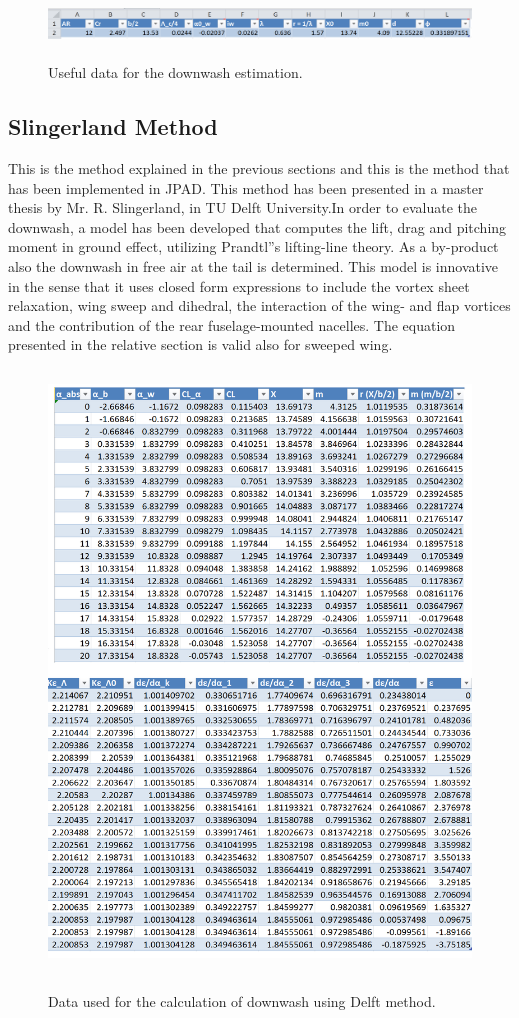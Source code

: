 \begin{figure}[H]
	\centering
{\includegraphics[height=1.1cm]{Immagini/datadownwash.png}} 
	\caption{Useful data for the downwash estimation.}
	\label{usefuldata}
\end{figure}

\subsection {Slingerland Method }

This is the method explained in the previous sections and this is the method that has been implemented in JPAD. This method has been presented in a master thesis by Mr. R. Slingerland, in TU Delft University.In order to evaluate the downwash, a model has been developed that computes the lift, drag and pitching moment in ground effect, utilizing Prandtl''s lifting-line theory. As a by-product also the downwash in free air at the tail is determined. This model is innovative in the sense that it uses closed form expressions to include the vortex sheet relaxation, wing sweep and dihedral, the interaction of the wing- and flap vortices and the contribution of the rear fuselage-mounted nacelles. The equation presented in the relative section is valid also for sweeped wing.

\begin{figure}[H]
\centering
{\includegraphics[height=16cm]{immagini/delft}} 
\caption{Data used for the calculation of downwash using Delft method.}
\label{delftdata}
\end{figure} 


